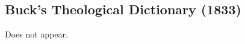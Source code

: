 \subsection{Buck's Theological Dictionary (1833)} %
	\label{SERAPH-BTD}
	
	Does not appear.

	



	
	
			
			
		

